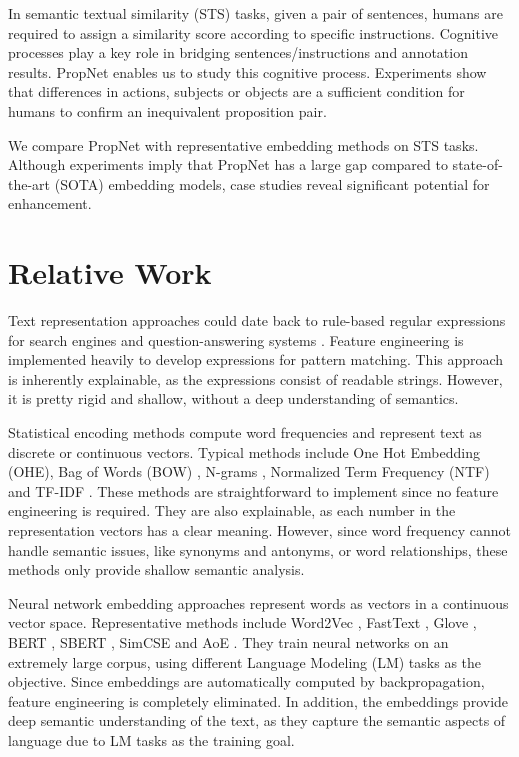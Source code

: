 In semantic textual similarity (STS) tasks, given a pair of sentences, humans are required to assign a similarity score according to specific instructions. Cognitive processes play a key role in bridging sentences/instructions and annotation results. PropNet enables us to study this cognitive process. Experiments show that differences in actions, subjects or objects are a sufficient condition for humans to confirm an inequivalent proposition pair.

We compare PropNet with representative embedding methods on STS tasks. Although
experiments imply that PropNet has a large gap compared to state-of-the-art (SOTA) embedding models, case studies reveal significant potential for enhancement.



\section{Relative Work}

Text representation approaches could date back to rule-based regular expressions for search engines and question-answering systems \cite{1985Generalized}. Feature engineering is implemented heavily to develop expressions for pattern matching. This approach is inherently explainable, as the expressions consist of readable strings. However, it is pretty rigid and shallow, without a deep understanding of semantics. 

Statistical encoding methods compute word frequencies and represent text as discrete or continuous vectors. Typical methods include One Hot Embedding (OHE), Bag of Words (BOW) \cite{harris54}, N-grams \cite{Katz:87},  Normalized Term Frequency (NTF) \cite{1968Automatic} and TF-IDF \cite{jones72astatistical}. These methods are straightforward to implement since no feature engineering is required. They are also explainable, as each number in the representation vectors has a clear meaning. However, since word frequency cannot handle semantic issues, like synonyms and antonyms, or word relationships, these methods only provide shallow semantic analysis.

Neural network embedding approaches represent words as vectors in a continuous vector space. Representative methods include Word2Vec \cite{mikolov2013efficient}, FastText \cite{bojanowski2016enriching, joulin2016bagtricksefficienttext, joulin2016fasttextzip}, Glove \cite{2014Glove}, BERT \cite{devlin2018bert}, SBERT \citep{Reimers2019SentenceBERTSE}, SimCSE \citep{Gao2021SimCSESC} and AoE \citep{Li2024AoEAE}. They train neural networks on an extremely large corpus, using different Language Modeling (LM) tasks as the objective. Since embeddings are automatically computed by backpropagation, feature engineering is completely eliminated. In addition, the embeddings provide deep semantic understanding of the text, as they capture the semantic aspects of language due to LM tasks as the training goal. 


